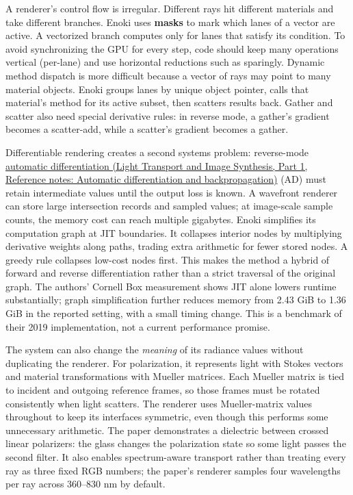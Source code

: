 A renderer's control flow is irregular. Different rays hit different materials and take different branches. Enoki uses \textbf{masks} to mark which lanes of a vector are active. A vectorized branch computes only for lanes that satisfy its condition. To avoid synchronizing the GPU for every step, code should keep many operations vertical (per-lane) and use horizontal reductions such as  sparingly. Dynamic method dispatch is more difficult because a vector of rays may point to many material objects. Enoki groups lanes by unique object pointer, calls that material's method for its active subset, then scatters results back. Gather and scatter also need special derivative rules: in reverse mode, a gather's gradient becomes a scatter-add, while a scatter's gradient becomes a gather.

Differentiable rendering creates a second systems problem: reverse-mode \href{../04-Light-Transport-and-Image-Synthesis-P01/main.pdf\#appendix-40df0855b4a7}{automatic differentiation (Light Transport and Image Synthesis, Part 1, Reference notes: Automatic differentiation and backpropagation)} (AD) must retain intermediate values until the output loss is known. A wavefront renderer can store large intersection records and sampled values; at image-scale sample counts, the memory cost can reach multiple gigabytes. Enoki simplifies its computation graph at JIT boundaries. It collapses interior nodes by multiplying derivative weights along paths, trading extra arithmetic for fewer stored nodes. A greedy rule collapses low-cost nodes first. This makes the method a hybrid of forward and reverse differentiation rather than a strict traversal of the original graph. The authors' Cornell Box measurement shows JIT alone lowers runtime substantially; graph simplification further reduces memory from 2.43 GiB to 1.36 GiB in the reported setting, with a small timing change. This is a benchmark of their 2019 implementation, not a current performance promise.

The system can also change the \emph{meaning} of its radiance values without duplicating the renderer. For polarization, it represents light with Stokes vectors and material transformations with Mueller matrices. Each Mueller matrix is tied to incident and outgoing reference frames, so those frames must be rotated consistently when light scatters. The renderer uses Mueller-matrix values throughout to keep its interfaces symmetric, even though this performs some unnecessary arithmetic. The paper demonstrates a dielectric between crossed linear polarizers: the glass changes the polarization state so some light passes the second filter. It also enables spectrum-aware transport rather than treating every ray as three fixed RGB numbers; the paper's renderer samples four wavelengths per ray across 360--830 nm by default.

